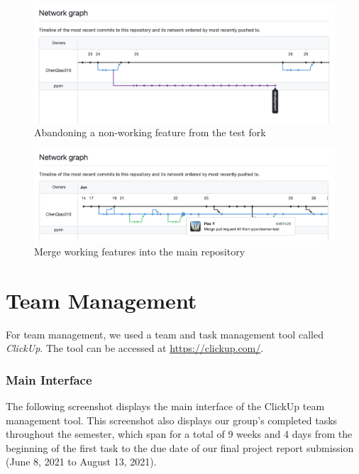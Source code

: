\documentclass[12pt, letterpaper]{article}
\begin{document}
 \begin{figure}[htbp]
	\centering
	\includegraphics[width=\textwidth]{images/28-feature-abandon.png}
	\caption{Abandoning a non-working feature from the test fork}
 \end{figure}

 \begin{figure}[htbp]
	\centering
	\includegraphics[width=\textwidth]{images/28-feature-merge.png}
	\caption{Merge working features into the main repository}
 \end{figure}

 \newpage

\section{Team Management}
For team management, we used a team and task management tool called \textit{ClickUp}. The tool can be accessed at \url{https://clickup.com/}.

\subsubsection*{Main Interface}
The following screenshot displays the main interface of the ClickUp team management tool. This screenshot also displays our group's completed tasks throughout the semester, which span for a total of 9 weeks and 4 days from the beginning of the first task to the due date of our final project report submission (June 8, 2021 to August 13, 2021).
\end{document}
